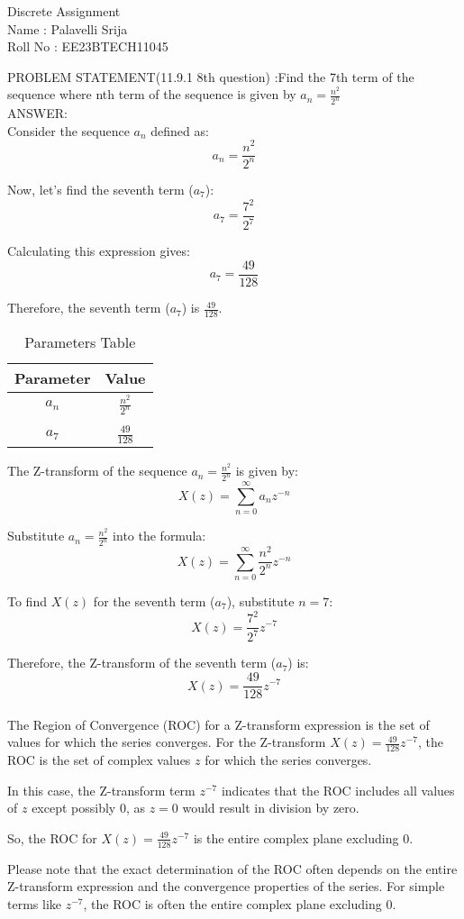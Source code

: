 \documentclass{article}
\begin{document}
\begin{center}
Discrete Assignment\\
Name : Palavelli Srija\\
Roll No : EE23BTECH11045\\
\end{center}
PROBLEM STATEMENT(11.9.1  8th question) :Find the 7th term of the sequence where nth term of the sequence is given by  \(a_n = \frac{n^2}{2^n}\)\\ 
ANSWER:\\
Consider the sequence \(a_n\) defined as:
\[ a_n = \frac{n^2}{2^n} \]

Now, let's find the seventh term (\(a_7\)):
\[ a_7 = \frac{7^2}{2^7} \]

Calculating this expression gives:
\[ a_7 = \frac{49}{128} \]

Therefore, the seventh term (\(a_7\)) is \(\frac{49}{128}\).\\
\begin{table}[h]
    \centering
    \caption{Parameters Table}
    \begin{tabular}{|c|c|}
                \hline
        \textbf{Parameter} & \textbf{Value} \\
        \hline
         $a_n$ &  $\frac{n^2}{2^n}$\\ \\
	 $a_7$ & $\frac{49}{128}$\\
        \hline   
    \end{tabular}
\end{table}

The Z-transform of the sequence \(a_n = \frac{n^2}{2^n}\) is given by:
\[ X(z) = \sum_{n=0}^{\infty} a_n z^{-n} \]

Substitute \(a_n = \frac{n^2}{2^n}\) into the formula:
\[ X(z) = \sum_{n=0}^{\infty} \frac{n^2}{2^n} z^{-n} \]

To find \(X(z)\) for the seventh term (\(a_7\)), substitute \(n = 7\):
\[ X(z) = \frac{7^2}{2^7} z^{-7} \]

Therefore, the Z-transform of the seventh term (\(a_7\)) is:
\[ X(z) = \frac{49}{128} z^{-7} \] \\
The Region of Convergence (ROC) for a Z-transform expression is the set of values for which the series converges. For the Z-transform \(X(z) = \frac{49}{128} z^{-7}\), the ROC is the set of complex values \(z\) for which the series converges.

In this case, the Z-transform term \(z^{-7}\) indicates that the ROC includes all values of \(z\) except possibly 0, as \(z = 0\) would result in division by zero.

So, the ROC for \(X(z) = \frac{49}{128} z^{-7}\) is the entire complex plane excluding 0.

Please note that the exact determination of the ROC often depends on the entire Z-transform expression and the convergence properties of the series. For simple terms like \(z^{-7}\), the ROC is often the entire complex plane excluding 0.
\end{document}

